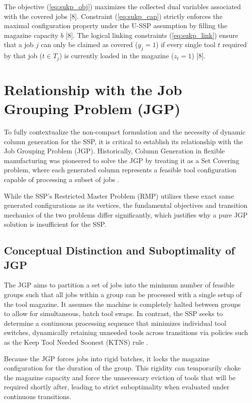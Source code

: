 \documentclass[12pt]{article}
\begin{document}
The objective (\ref{eq:sukp_obj}) maximizes the collected dual variables associated with the covered jobs [8]. Constraint (\ref{eq:sukp_cap}) strictly enforces the maximal configuration property under the U-SSP assumption by filling the magazine capacity $b$ [8]. The logical linking constraints (\ref{eq:sukp_link}) ensure that a job $j$ can only be claimed as covered ($y_j = 1$) if every single tool $t$ required by that job ($t \in T_j$) is currently loaded in the magazine ($z_t = 1$) [8].

\section{Relationship with the Job Grouping Problem (JGP)}

To fully contextualize the non-compact formulation and the necessity of dynamic column generation for the SSP, it is critical to establish its relationship with the Job Grouping Problem (JGP). Historically, Column Generation in flexible manufacturing was pioneered to solve the JGP by treating it as a Set Covering problem, where each generated column represents a feasible tool configuration capable of processing a subset of jobs \citep{Crama1994}. 

While the SSP's Restricted Master Problem (RMP) utilizes these exact same generated configurations as its vertices, the fundamental objectives and transition mechanics of the two problems differ significantly, which justifies why a pure JGP solution is insufficient for the SSP.

\subsection{Conceptual Distinction and Suboptimality of JGP}

The JGP aims to partition a set of jobs into the minimum number of feasible groups such that all jobs within a group can be processed with a single setup of the tool magazine. It assumes the machine is completely halted between groups to allow for simultaneous, batch tool swaps. In contrast, the SSP seeks to determine a continuous processing sequence that minimizes individual tool switches, dynamically retaining unneeded tools across transitions via policies such as the Keep Tool Needed Soonest (KTNS) rule \citep{Tang1988}.

Because the JGP forces jobs into rigid batches, it locks the magazine configuration for the duration of the group. This rigidity can temporarily choke the magazine capacity and force the unnecessary eviction of tools that will be required shortly after, leading to strict suboptimality when evaluated under continuous transitions.
\end{document}

